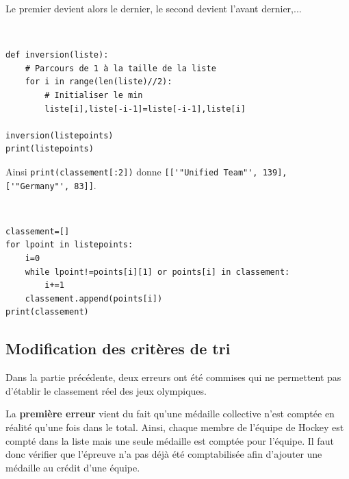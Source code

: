 
Le premier devient alors le dernier, le second devient l'avant dernier,...

\begin{solution}~\ \\
\begin{verbatim}
def inversion(liste):
    # Parcours de 1 à la taille de la liste
    for i in range(len(liste)//2):
        # Initialiser le min
        liste[i],liste[-i-1]=liste[-i-1],liste[i]

inversion(listepoints)
print(listepoints)
\end{verbatim}
\end{solution}


Ainsi \verb?print(classement[:2])? donne \verb?[['"Unified Team"', 139], ['"Germany"', 83]]?.

\begin{solution}~\ \\
\begin{verbatim}
classement=[]
for lpoint in listepoints:
    i=0
    while lpoint!=points[i][1] or points[i] in classement:
        i+=1
    classement.append(points[i])
print(classement)
\end{verbatim}
\end{solution}

\subsection{Modification des critères de tri}

Dans la partie précédente, deux erreurs ont été commises qui ne permettent pas d'établir le classement réel des jeux olympiques.

La \textbf{première erreur} vient du fait qu'une médaille collective n'est comptée en réalité qu'une fois dans le total. Ainsi, chaque membre de l'équipe de Hockey est compté dans la liste mais une seule médaille est comptée pour l'équipe. Il faut donc vérifier que l'épreuve n'a pas déjà été comptabilisée afin d'ajouter une médaille au crédit d'une équipe.

